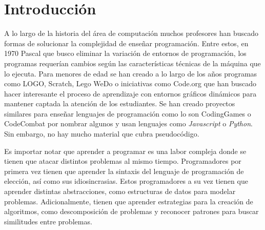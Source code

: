 \chapter*{Introducción}\label{introduccion}


A lo largo de la historia del área de computación muchos profesores han buscado formas de solucionar la complejidad de enseñar programación. Entre estos, en 1970 Pascal que busco eliminar la variación de entornos de programación, los programas requerían cambios según las características técnicas de la máquina que lo ejecuta. Para menores de edad se han creado a lo largo de los años programas como LOGO, Scratch, Lego WeDo o iniciativas como Code.org que han buscado hacer interesante el proceso de aprendizaje con entornos gráficos dinámicos para mantener captada la atención de los estudiantes. Se han creado proyectos similares para enseñar lenguajes de programación como lo son CodingGames o CodeCombat por nombrar algunos y usan lenguajes como \textit{Javascript} o \textit{Python}. Sin embargo, no hay mucho material que cubra pseudocódigo.

Es importar notar que aprender a programar es una labor compleja donde se tienen que atacar distintos problemas al mismo tiempo. Programadores por primera vez tienen que aprender la sintaxis del lenguaje de programación de elección, así como sus idiosincrasias. Estos programadores a su vez tienen que aprender distintas abstracciones, como estructuras de datos para modelar problemas. Adicionalmente, tienen que aprender estrategias para la creación de algoritmos, como descomposición de problemas y reconocer patrones para buscar similitudes entre problemas.


